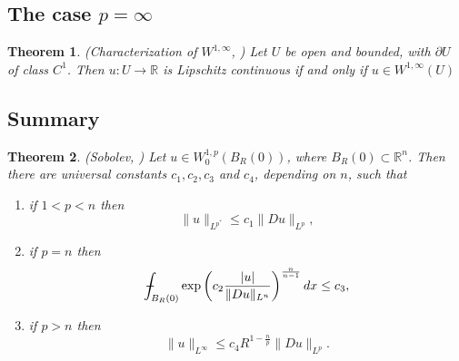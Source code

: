\documentclass[11pt,a4paper]{report}
\newtheorem{theorem}{Theorem}[section]
\theoremstyle{definition}
\def\Xint#1{\mathchoice
{\XXint\displaystyle\textstyle{#1}}%
{\XXint\textstyle\scriptstyle{#1}}%
{\XXint\scriptstyle\scriptscriptstyle{#1}}%
{\XXint\scriptscriptstyle\scriptscriptstyle{#1}}%
\!\int}
\def\XXint#1#2#3{{\setbox0=\hbox{$#1{#2#3}{\int}$}
\vcenter{\hbox{$#2#3$}}\kern-.5\wd0}}
\def\dashint{\Xint-}
\begin{document}
\subsection{The case $p = \infty$}

\begin{theorem}
	\emph{(Characterization of $W^{1, \infty}$, \cite{2010_Evans})}
	Let $U$ be open and bounded, with $\partial U$ of class $C^1$. 
    Then $u: U \rightarrow \mathbb{R}$ is Lipschitz continuous if and only if $u \in W^{1, \infty}(U)$
\end{theorem}

\subsection{Summary}


\begin{theorem}
	\emph{(Sobolev, \cite[Theorem 7.29]{2012_Giaquinta})}
	Let $u \in W_0^{1, p}\left(B_R(0)\right)$, where $B_R(0) \subset \mathbb{R}^n$. Then there are universal constants $c_1, c_2, c_3$ and $c_4$, depending on $n$, such that
	\begin{enumerate}[label=(\alph*)] 
	\rm\item if $1<p<n$ then 
	\begin{equation*} 
		\|u\|_{L^{p^*}} \leq c_1\|D u\|_{L^p},
	\end{equation*}
	\rm\item if $p = n$ then 
	\begin{equation*} 
		\dashint_{B_R(0)} \exp \left(c_2 \frac{|u|}{\|D u\|_{L^n}}\right)^{\frac{n}{n-1}} d x \leq c_3,
	\end{equation*}
	\rm\item if $p>n$ then 
	\begin{equation*} 
		\|u\|_{L^{\infty}} \leq c_4 R^{1-\frac{n}{p}}\|D u\|_{L^p}.
	\end{equation*}
	\end{enumerate}
\end{theorem}





{}
\end{document}
